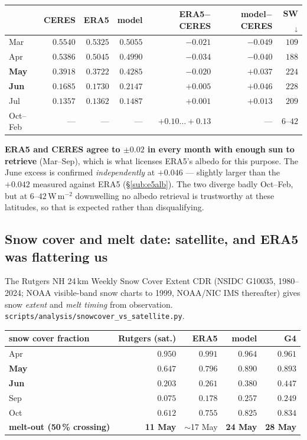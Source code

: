\documentclass[10pt]{article}
\begin{document}
\begin{center}\footnotesize
\begin{tabular}{l r r r r r r}
\toprule
 & CERES & ERA5 & model & ERA5$-$CERES & \textbf{model$-$CERES} & SW$_\downarrow$ \\
\midrule
Mar & $0.5540$ & $0.5325$ & $0.5055$ & $-0.021$ & $\mathbf{-0.049}$ & $109$ \\
Apr & $0.5386$ & $0.5045$ & $0.4990$ & $-0.034$ & $\mathbf{-0.040}$ & $188$ \\
\textbf{May} & $0.3918$ & $0.3722$ & $0.4285$ & $-0.020$ & $\mathbf{+0.037}$ & $224$ \\
\textbf{Jun} & $0.1685$ & $0.1730$ & $0.2147$ & $+0.005$ & $\mathbf{+0.046}$ & $228$ \\
Jul & $0.1357$ & $0.1362$ & $0.1487$ & $+0.001$ & $+0.013$ & $209$ \\
Oct--Feb & --- & --- & --- & $+0.10\ldots+0.13$ & --- & $6$--$42$ \\
\bottomrule
\end{tabular}
\end{center}

\noindent \textbf{ERA5 and CERES agree to $\pm0.02$ in every month with enough sun to
retrieve} (Mar--Sep), which is what licenses ERA5's albedo for this purpose. The June
excess is confirmed \emph{independently} at $+0.046$ --- slightly larger than the
$+0.042$ measured against ERA5 (\S\ref{sub:e5alb}). The two diverge badly Oct--Feb, but
at $6$--$42$\,W\,m$^{-2}$ downwelling no albedo retrieval is trustworthy at these
latitudes, so that is expected rather than disqualifying.

\subsection{Snow cover and melt date: satellite, and ERA5 was flattering us}\label{sub:satsnow}
The Rutgers NH 24\,km Weekly Snow Cover Extent CDR (NSIDC G10035, 1980--2024; NOAA
visible-band snow charts to 1999, NOAA/NIC IMS thereafter) gives snow \emph{extent} and
\emph{melt timing} from observation. \texttt{scripts/analysis/snowcover\_vs\_satellite.py}.

\begin{center}\footnotesize
\begin{tabular}{l r r r r}
\toprule
snow cover fraction & \textbf{Rutgers (sat.)} & ERA5 & model & \textbf{G4} \\
\midrule
Apr & $0.950$ & $0.991$ & $0.964$ & $0.961$ \\
\textbf{May} & $\mathbf{0.647}$ & $0.796$ & $0.890$ & $0.893$ \\
\textbf{Jun} & $\mathbf{0.203}$ & $0.261$ & $0.380$ & $\mathbf{0.447}$ \\
Sep & $0.075$ & $0.178$ & $0.257$ & $0.249$ \\
Oct & $0.612$ & $0.755$ & $0.825$ & $0.834$ \\
\midrule
\textbf{melt-out (50\,\% crossing)} & \textbf{11 May} & $\sim$17 May & \textbf{24 May} & \textbf{28 May} \\
\bottomrule
\end{tabular}
\end{center}
\end{document}
